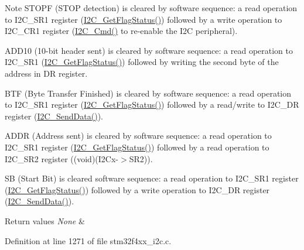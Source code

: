 \begin{DoxyNote}{Note}
S\-T\-O\-P\-F (S\-T\-O\-P detection) is cleared by software sequence\-: a read operation to I2\-C\-\_\-\-S\-R1 register (\hyperlink{group___i2_c_ga15c95d0ed124f029621a2061b1677ee7}{I2\-C\-\_\-\-Get\-Flag\-Status()}) followed by a write operation to I2\-C\-\_\-\-C\-R1 register (\hyperlink{group___i2_c_ga7e1323c9133c2cb424dfb5b10b7d2f0b}{I2\-C\-\_\-\-Cmd()} to re-\/enable the I2\-C peripheral). 

A\-D\-D10 (10-\/bit header sent) is cleared by software sequence\-: a read operation to I2\-C\-\_\-\-S\-R1 (\hyperlink{group___i2_c_ga15c95d0ed124f029621a2061b1677ee7}{I2\-C\-\_\-\-Get\-Flag\-Status()}) followed by writing the second byte of the address in D\-R register. 

B\-T\-F (Byte Transfer Finished) is cleared by software sequence\-: a read operation to I2\-C\-\_\-\-S\-R1 register (\hyperlink{group___i2_c_ga15c95d0ed124f029621a2061b1677ee7}{I2\-C\-\_\-\-Get\-Flag\-Status()}) followed by a read/write to I2\-C\-\_\-\-D\-R register (\hyperlink{group___i2_c_ga7bd9e70b8eafde0dd5eb42b0d95fe1a9}{I2\-C\-\_\-\-Send\-Data()}). 

A\-D\-D\-R (Address sent) is cleared by software sequence\-: a read operation to I2\-C\-\_\-\-S\-R1 register (\hyperlink{group___i2_c_ga15c95d0ed124f029621a2061b1677ee7}{I2\-C\-\_\-\-Get\-Flag\-Status()}) followed by a read operation to I2\-C\-\_\-\-S\-R2 register ((void)(I2\-Cx-\/$>$S\-R2)). 

S\-B (Start Bit) is cleared software sequence\-: a read operation to I2\-C\-\_\-\-S\-R1 register (\hyperlink{group___i2_c_ga15c95d0ed124f029621a2061b1677ee7}{I2\-C\-\_\-\-Get\-Flag\-Status()}) followed by a write operation to I2\-C\-\_\-\-D\-R register (\hyperlink{group___i2_c_ga7bd9e70b8eafde0dd5eb42b0d95fe1a9}{I2\-C\-\_\-\-Send\-Data()}).
\end{DoxyNote}

\begin{DoxyRetVals}{Return values}
{\em None} & \\
\hline
\end{DoxyRetVals}


Definition at line 1271 of file stm32f4xx\-\_\-i2c.\-c.

